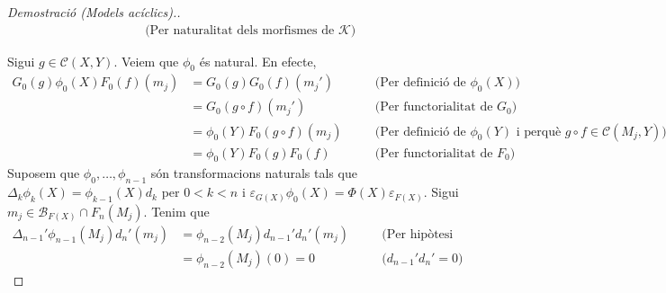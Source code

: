\documentclass[compress]{article}
\theoremstyle{definition}
\begin{document}
\begin{proof}[Demostració (Models acíclics).]
\begin{align*}
        &\quad&\textrm{(Per naturalitat dels morfismes de $\mathscr{K}$)}
    \end{align*}
    \begin{center}
    \end{center}
    Sigui $g\in\mathscr{C}(X,Y)$. Veiem que $\phi_{0}$ és natural. En efecte,
    \begin{align*}
        G_{0}(g)\phi_{0}(X)F_{0}(f)(m_{j})
        &=G_{0}(g)G_{0}(f)(m_{j}')
        &\quad&\textrm{(Per definició de $\phi_{0}(X)$)}\\
        &=G_{0}(g\circ f)(m_{j}')
        &\quad&\textrm{(Per functorialitat de $G_{0}$)}\\
        &=\phi_{0}(Y)F_{0}(g\circ f)(m_{j})
        &\quad&\textrm{(Per definició de $\phi_{0}(Y)$ i perquè $g\circ f\in\mathscr{C}(M_{j},Y)$)}\\
        &=\phi_{0}(Y)F_{0}(g)F_{0}(f)
        &\quad&\textrm{(Per functorialitat de $F_{0}$)}
    \end{align*}
    Suposem que $\phi_{0},\ldots,\phi_{n-1}$ són transformacions naturals tals que $\Delta_{k}\phi_{k}(X)=\phi_{k-1}(X)d_{k}$ per $0<k<n$ i $\varepsilon_{G(X)}\phi_{0}(X)=\Phi(X)\varepsilon_{F(X)}$. Sigui $m_{j}\in\mathscr{B}_{F(X)}\cap F_{n}(M_{j})$. Tenim que
    \begin{align*}
        \Delta_{n-1}'\phi_{n-1}(M_{j})d_{n}'(m_{j})
        &=\phi_{n-2}(M_{j})d_{n-1}'d_{n}'(m_{j})
        &\quad&\textrm{(Per hipòtesi d'inducció)}\\
        &=\phi_{n-2}(M_{j})(0)=0
        &\quad&\textrm{($d_{n-1}'d_{n}'=0$)}

\end{align*}
\end{proof}
\end{document}
